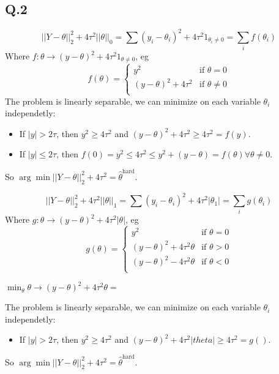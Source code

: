 \documentclass[12pt]{article}
\newcommand{\Q}[1]{\subsection*{Q.#1}}
\newenvironment{question}[1]
{\Q{#1}}{}
\begin{document}
\begin{question}{2}


  $$
    ||Y - \theta||_2^2 + 4\tau^2 ||\theta||_0 = \sum (y_i - \theta_i)^2 + 4\tau^2 1_{\theta_i \ne 0} = \sum_i f(\theta_i)
    $$
    Where $f: \theta \rightarrow (y - \theta)^2 + 4\tau^2 1_{\theta \ne 0}$, eg
    \[
      f(\theta) = \left\{
        \begin{array}{cc}
          y^2 & \text{if } \theta = 0\\
          (y - \theta)^2 + 4 \tau^2& \text{if } \theta \ne 0\\
        \end{array}
      \right.
    \]
    The problem is linearly separable, we can minimize on each variable $\theta_i$ independetly:
    \begin{itemize}
    \item If $|y| > 2\tau$, then $y^2 \ge 4\tau^2$ and  $(y - \theta)^2 + 4\tau^2 \ge 4\tau^2 = f(y)$.
    \item If $|y| \le 2\tau$, then $f(0) = y^2 \le 4\tau^2 \le y^2 + (y-\theta) = f(\theta) \forall \theta \ne 0$.
    \end{itemize}
    So $\arg\min ||Y - \theta||_2^2 + 4\tau^2 = \hat \theta^{\text{hard}}$.


    
    $$
    ||Y - \theta||_2^2 + 4\tau^2 ||\theta||_1 = \sum (y_i - \theta_i)^2 + 4\tau^2 |\theta_1| = \sum_i g(\theta_i)
    $$
    Where $g: \theta \rightarrow (y - \theta)^2 + 4\tau^2 |\theta|$, eg
    \[
      g(\theta) = \left\{
        \begin{array}{cc}
          y^2 & \text{if } \theta = 0\\
          (y - \theta)^2 + 4 \tau^2 \theta& \text{if } \theta > 0\\
          (y - \theta)^2 - 4 \tau^2 \theta& \text{if } \theta < 0\\
        \end{array}
      \right.
    \]

    $\min_{\theta} \theta \rightarrow (y - \theta)^2 + 4\tau^2\theta = $

    
    The problem is linearly separable, we can minimize on each variable $\theta_i$ independetly:
    \begin{itemize}
    \item If $|y| > 2\tau$, then $y^2 \ge 4\tau^2$ and  $(y - \theta)^2 + 4\tau^2|theta| \ge 4\tau^2 = g()$.
    \end{itemize}
    So $\arg\min ||Y - \theta||_2^2 + 4\tau^2 = \hat \theta^{\text{hard}}$.


  \end{question}
\end{document}
